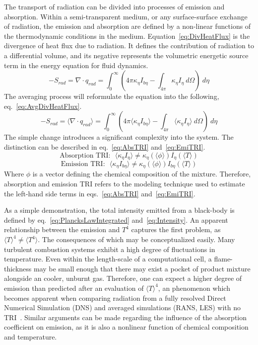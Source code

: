 The transport of radiation can be divided into processes of emission and absorption. 
Within a semi-transparent medium, or any surface-surface exchange of radiation, the emission and absorption are defined by a non-linear functions of the thermodynamic conditions in the medium.
Equation~\ref{eq:DivHeatFlux} is the divergence of heat flux due to radiation. It defines the contribution of radiation to a differential volume, and its negative represents the volumetric energetic source term in the energy equation for fluid dynamics.
\begin{equation}
    -S_{rad}=\nabla\cdot{}q_{rad} = \int_0^\infty{\left(4\pi{}\kappa_\eta{}I_{b\eta{}}-\int_{4\pi}{\kappa{}_\eta{}I_\eta{}~d\Omega{}}\right)~d\eta{}}
    \label{eq:DivHeatFlux}
\end{equation}
The averaging process will reformulate the equation into the following, eq.~\ref{eq:AvgDivHeatFlux}.
\begin{equation}
    -S_{rad}=\langle\nabla\cdot{}q_{rad}\rangle = \int_0^\infty{\left(4\pi{}\langle\kappa_\eta{}I_{b\eta{}}\rangle-\int_{4\pi}{\langle\kappa{}_\eta{}I_\eta{}\rangle~d\Omega{}}\right)~d\eta{}}
    \label{eq:AvgDivHeatFlux}
\end{equation}
The simple change introduces a significant complexity into the system. The distinction can be described in eq.~\ref{eq:AbsTRI} and~\ref{eq:EmiTRI}.
\begin{equation}
    \text{Absorption TRI:~~}\langle\kappa_\eta{}I_{\eta}\rangle \neq \kappa_\eta{}(\langle\phi{}\rangle) I_{\eta}(\langle{}T\rangle{})
    \label{eq:AbsTRI}
\end{equation}
\begin{equation}
    \text{Emission TRI:~~}\langle\kappa_\eta{}I_{b\eta}\rangle \neq \kappa_\eta{}(\langle\phi{}\rangle) I_{b\eta}(\langle{}T\rangle{})
    \label{eq:EmiTRI}
\end{equation}
Where $\phi{}$ is a vector defining the chemical composition of the mixture. Therefore, absorption and emission TRI refers to the modeling technique used to estimate the left-hand side terms in eqs.~\ref{eq:AbsTRI} and~\ref{eq:EmiTRI}.

As a simple demonstration, the total intensity emitted from a black-body is defined by eq.~\ref{eq:PlancksLawIntegrated} and~\ref{eq:Intensity}.
An apparent relationship between the emission and $T^4$ captures the first problem, as $\langle{T}\rangle^4 \neq \langle{}T^4\rangle$. 
The consequences of which may be conceptualized easily. Many turbulent combustion systems exhibit a high degree of fluctuations in temperature. Even within the length-scale of a computational cell, a flame-thickness may be small enough that there may exist a pocket of product mixture alongside an cooler, unburnt gas.
Therefore, one can expect a higher degree of emission than predicted after an evaluation of $\langle{T}\rangle^4$, an phenomenon which becomes apparent when comparing radiation from a fully resolved Direct Numerical Simulation (DNS) and averaged simulations (RANS, LES) with no TRI~\cite{Modest2016RadiativeSystems}.
Similar arguments can be made regarding the influence of the absorption coefficient on emission, as it is also a nonlinear function of chemical composition and temperature.

